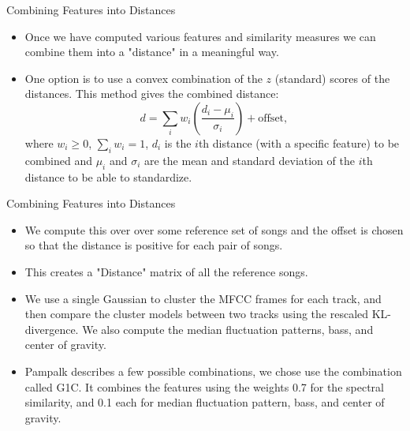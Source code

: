 \documentclass[xcolor=dvipsnames,t]{beamer} %
\begin{document}
\begin{frame}{Combining Features into Distances}

\begin{itemize}
\item Once we have computed various features and similarity measures we can combine them into a "distance" in a meaningful way. 
\item One option is to use a convex combination of the $z$ (standard) scores of the distances. This method gives the combined distance:
 \[ d = \sum_{i} w_i \left(\dfrac{d_i - \mu_i}{\sigma_i}\right) + \text{offset}, \]
 where  $w_i\ge 0$, $\sum_i w_i=1$, $d_i$ is the $i$th distance (with a specific feature) to be combined and $\mu_i$ and $\sigma_i$ are the mean and standard deviation of the $i$th distance to be able to standardize. 
 \end{itemize}
 \end{frame}
 \begin{frame}{Combining Features into Distances}

\begin{itemize}
 \item We compute this over over some reference set of songs and the offset is chosen so that the distance is positive for each pair of songs.
 \item This creates a "Distance" matrix of all the reference songs. 
  \item We use a single Gaussian to cluster the MFCC frames for each track, and then compare the cluster models between two tracks using the rescaled KL- divergence. We also compute the median fluctuation patterns, bass, and center of gravity. 
 \item Pampalk describes a few possible combinations, we chose use the combination called G1C. It combines the features using the weights 0.7 for the spectral similarity, and 0.1 each for median fluctuation pattern, bass, and center of gravity.
 \end{itemize}
\end{frame}
\end{document}
